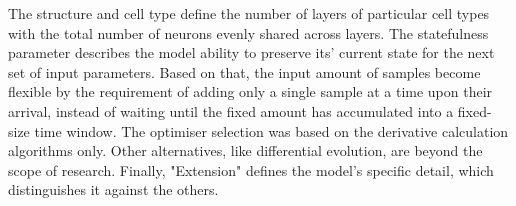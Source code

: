 \begin{table}[h]
    \renewcommand{\arraystretch}{1.3}
    \caption{Testing models summary.}
    \centering
    \label{tab:experiment}
\end{table}

%
%
The structure and cell type define the number of layers of particular cell types with the total number of neurons evenly shared across layers.
The statefulness parameter describes the model ability to preserve its' current state for the next set of input parameters.
Based on that, the input amount of samples become flexible by the requirement of adding only a single sample at a time upon their arrival, instead of waiting until the fixed amount has accumulated into a fixed-size time window.
The optimiser selection was based on the derivative calculation algorithms only.
Other alternatives, like differential evolution, are beyond the scope of research.
Finally, "Extension" defines the model's specific detail, which distinguishes it against the others.

